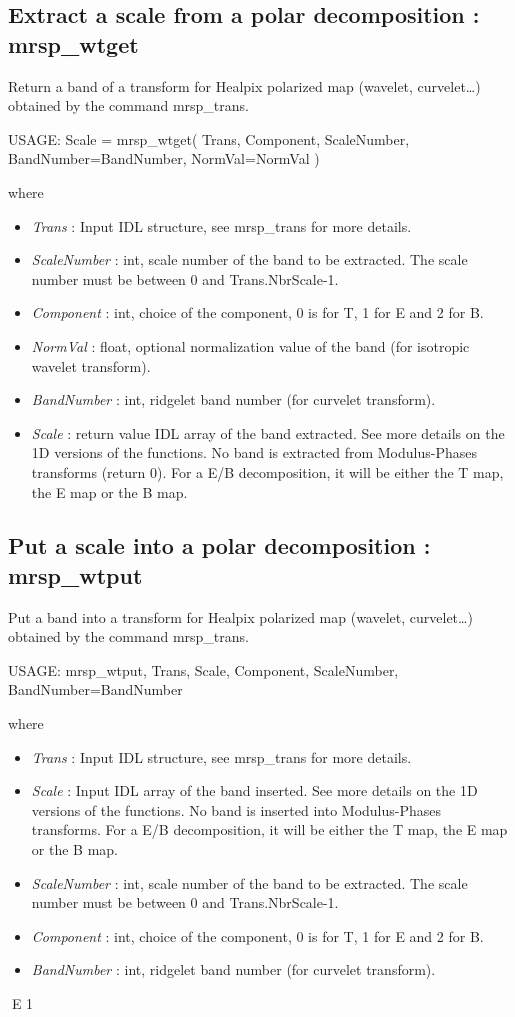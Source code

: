 \subsection{Extract a scale from a polar decomposition : mrsp\_wtget}
Return a band of a transform for Healpix polarized map (wavelet, curvelet\ldots) obtained by the command mrsp\_trans.
{\bf
\begin{center}
     USAGE:  Scale = mrsp\_wtget( Trans, Component, ScaleNumber, BandNumber=BandNumber, NormVal=NormVal )
\end{center}}
where
\begin{itemize}
\item {\em Trans} : Input IDL structure, see mrsp\_trans for more details.
\item {\em ScaleNumber} : int, scale number of the band to be extracted. The scale number must be between 0 and Trans.NbrScale-1.
\item {\em Component} : int, choice of the component, 0 is for T, 1 for E and 2 for B.
\item {\em NormVal} : float, optional normalization value of the band (for isotropic wavelet transform).
\item {\em BandNumber} : int, ridgelet band number (for curvelet transform).
\item {\em Scale} : return value IDL array of the band extracted. See more details on the 1D versions of the functions. 
No band is extracted from Modulus-Phases transforms (return 0). For a E/B decomposition, it will be either the T map, the E map or the B map.
\end{itemize}



\subsection{Put a scale into a polar decomposition : mrsp\_wtput}
Put a band into a transform for Healpix polarized map (wavelet, curvelet\ldots) obtained by the command mrsp\_trans.
{\bf
\begin{center}
     USAGE:   mrsp\_wtput, Trans, Scale, Component, ScaleNumber, BandNumber=BandNumber
\end{center}}
where
\begin{itemize}
\item {\em Trans} : Input IDL structure, see mrsp\_trans for more details.
\item {\em Scale} : Input IDL array of the band inserted. See more details on the 1D versions of the functions. 
No band is inserted into Modulus-Phases transforms. For a E/B decomposition, it will be either the T map, the E map or the B map.
\item {\em ScaleNumber} : int, scale number of the band to be extracted. The scale number must be between 0 and Trans.NbrScale-1.
\item {\em Component} : int, choice of the component, 0 is for T, 1 for E and 2 for B.
\item {\em BandNumber} : int, ridgelet band number (for curvelet transform).
\end{itemize}

E 1
